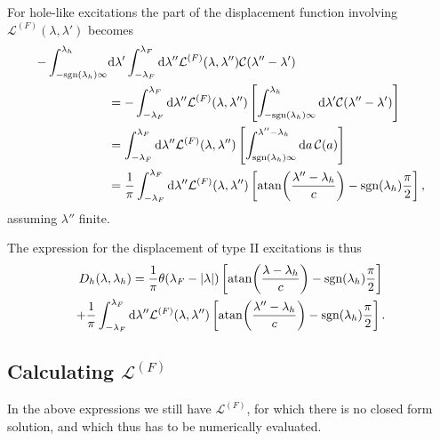 \documentclass[11pt, a4paper]{report} %
\begin{document}
For hole-like excitations the part of the displacement function involving \(\mathcal{L}^{(F)}(\lambda,\lambda')\) becomes
\begin{align}
	 - \int_{-\textrm{sgn}(\lambda_h)\infty}^{\lambda_h} &\dd \lambda' \int_{-\lambda_F}^{\lambda_F} \dd \lambda''  \mathcal{L}^{(F)}(\lambda,\lambda'') \mathcal{C}(\lambda''-\lambda')\\
	 &= - \int_{-\lambda_F}^{\lambda_F} \dd \lambda''  \mathcal{L}^{(F)}(\lambda,\lambda'')\left[ \int_{-\textrm{sgn}(\lambda_h)\infty}^{\lambda_h} \dd \lambda' \mathcal{C}(\lambda''-\lambda')\right]\\
	 &= \int_{-\lambda_F}^{\lambda_F} \dd \lambda''  \mathcal{L}^{(F)}(\lambda,\lambda'')\left[ \int_{\textrm{sgn}(\lambda_h)\infty}^{\lambda''-\lambda_h} \dd a \, \mathcal{C}(a)\right]\\
	 &= \frac{1}{\pi}\int_{-\lambda_F}^{\lambda_F} \dd  \lambda''  \mathcal{L}^{(F)}(\lambda,\lambda'')\left[ \atan(\frac{\lambda''-\lambda_h}{c}) - \textrm{sgn}(\lambda_h)\frac{\pi}{2}\right],
\end{align}
assuming \(\lambda''\) finite.

The expression for the displacement of type II excitations is thus
\begin{multline}
	D_h(\lambda, \lambda_h) = \frac{1}{\pi}\theta(\lambda_F - \abs{\lambda}) \left[ \atan(\frac{\lambda-\lambda_h}{c}) - \textrm{sgn}(\lambda_h)\frac{\pi}{2}\right] \\+
	\frac{1}{\pi}\int_{-\lambda_F}^{\lambda_F} \dd  \lambda''  \mathcal{L}^{(F)}(\lambda,\lambda'')\left[ \atan(\frac{\lambda''-\lambda_h}{c}) - \textrm{sgn}(\lambda_h)\frac{\pi}{2}\right].
\end{multline}

\subsection{Calculating \(\mathcal{L}^{(F)}\)}

In the above expressions we still have \(\mathcal{L}^{(F)}\), for which there is no closed form solution, and which thus has to be numerically evaluated.
\end{document}
